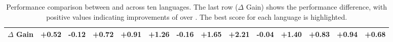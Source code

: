 \begin{table*}[!t]
{\begin{tabular}{l|ccccccc|c|cc|ccc}
$\Delta$ Gain & +0.52 & -0.12 & +0.72 & +0.91 & +1.26 & -0.16 & +1.65 & +2.21 & -0.04 & +1.40 & +0.83 & +0.94 & +0.68 \\
\bottomrule
\end{tabular}}
\caption{Performance comparison between \themodel{} and \themodelweb{} across ten languages. The last row ($\Delta$ Gain) shows the performance difference, with positive values indicating improvements of \themodelweb{} over \themodel{}. The best score for each language is highlighted.}
\label{tab:main_real}
\end{table*}
